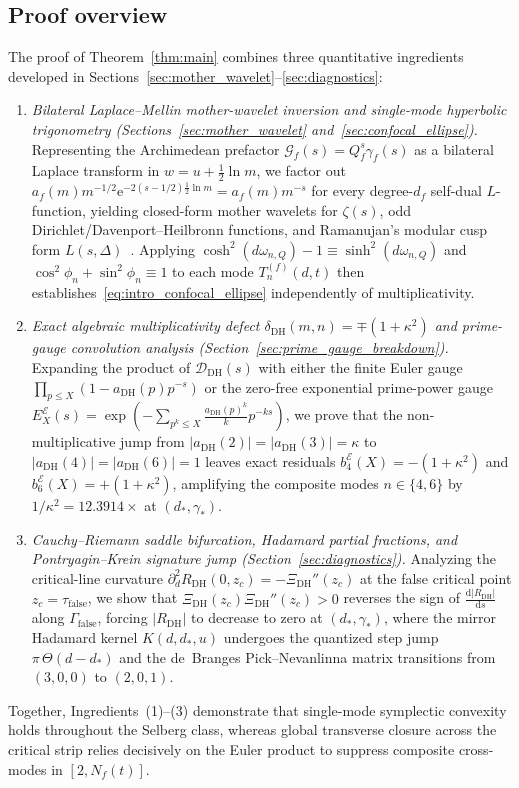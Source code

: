\documentclass[11pt,reqno]{amsart}
\theoremstyle{definition}
\theoremstyle{remark}
\numberwithin{equation}{section}
\newcommand{\dd}{\mathrm{d}}
\newcommand{\ee}{\mathrm{e}}
\newcommand{\DHf}{\mathrm{DH}}
\begin{document}
\subsection{Proof overview}\label{subsec:proof_overview}

The proof of Theorem~\ref{thm:main} combines three quantitative ingredients developed in Sections~\ref{sec:mother_wavelet}--\ref{sec:diagnostics}:
\begin{enumerate}[label=\textup{(\arabic*)},leftmargin=2.2em]
\item \textit{Bilateral Laplace--Mellin mother-wavelet inversion and single-mode hyperbolic trigonometry (Sections~\ref{sec:mother_wavelet} and~\ref{sec:confocal_ellipse}).} Representing the Archimedean prefactor $\mathcal{G}_f(s) = Q_f^s\gamma_f(s)$ as a bilateral Laplace transform in $w = u + \frac{1}{2}\ln m$, we factor out $a_f(m)m^{-1/2}\ee^{-2(s-1/2)\frac{1}{2}\ln m} = a_f(m)m^{-s}$ for every degree-$d_f$ self-dual $L$-function, yielding closed-form mother wavelets for $\zeta(s)$, odd Dirichlet/Davenport--Heilbronn functions, and Ramanujan's modular cusp form $L(s,\Delta)$~\cite{deligne1974}. Applying $\cosh^2(d\omega_{n,Q}) - 1 \equiv \sinh^2(d\omega_{n,Q})$ and $\cos^2\phi_n + \sin^2\phi_n \equiv 1$ to each mode $T_n^{(f)}(d,t)$ then establishes~\eqref{eq:intro_confocal_ellipse} independently of multiplicativity.
\item \textit{Exact algebraic multiplicativity defect $\delta_{\DHf}(m,n) = \mp(1+\kappa^2)$ and prime-gauge convolution analysis (Section~\ref{sec:prime_gauge_breakdown}).} Expanding the product of $\mathcal{D}_{\DHf}(s)$ with either the finite Euler gauge $\prod_{p \le X}(1 - a_{\DHf}(p)p^{-s})$ or the zero-free exponential prime-power gauge $E_X^{\mathcal{E}}(s) = \exp(-\sum_{p^k \le X} \frac{a_{\DHf}(p)^k}{k}p^{-ks})$, we prove that the non-multiplicative jump from $|a_{\DHf}(2)| = |a_{\DHf}(3)| = \kappa$ to $|a_{\DHf}(4)| = |a_{\DHf}(6)| = 1$ leaves exact residuals $b_4^{\mathcal{E}}(X) = -(1+\kappa^2)$ and $b_6^{\mathcal{E}}(X) = +(1+\kappa^2)$, amplifying the composite modes $n \in \{4, 6\}$ by $1/\kappa^2 = 12.3914\times$ at $(d_*, \gamma_*)$.
\item \textit{Cauchy--Riemann saddle bifurcation, Hadamard partial fractions, and Pontryagin--Krein signature jump (Section~\ref{sec:diagnostics}).} Analyzing the critical-line curvature $\partial_d^2 R_{\DHf}(0, z_c) = -\Xi_{\DHf}''(z_c)$ at the false critical point $z_c = \tau_{\mathrm{false}}$, we show that $\Xi_{\DHf}(z_c)\Xi_{\DHf}''(z_c) > 0$ reverses the sign of $\frac{\dd|R_{\DHf}|}{\dd s}$ along $\Gamma_{\mathrm{false}}$, forcing $|R_{\DHf}|$ to decrease to zero at $(d_*, \gamma_*)$, where the mirror Hadamard kernel $K(d, d_*, u)$ undergoes the quantized step jump $\pi\,\Theta(d - d_*)$ and the de~Branges Pick--Nevanlinna matrix transitions from $(3,0,0)$ to $(2,0,1)$.
\end{enumerate}
Together, Ingredients~(1)--(3) demonstrate that single-mode symplectic convexity holds throughout the Selberg class, whereas global transverse closure across the critical strip relies decisively on the Euler product to suppress composite cross-modes in $[2, N_f(t)]$.
\end{document}
